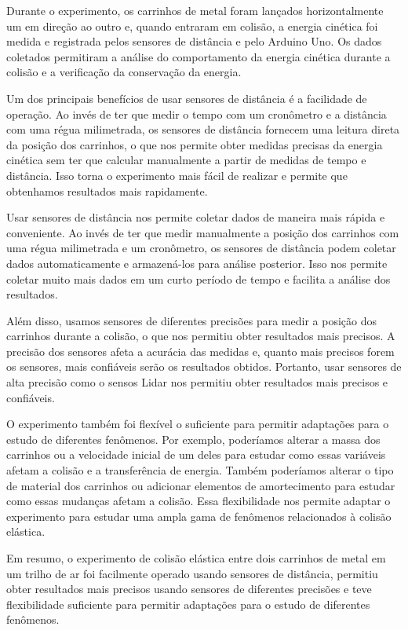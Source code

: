 \documentclass[a4paper,12pt]{article}
\begin{document}
\begin{multicols}{2}
Durante o experimento, os carrinhos de metal foram lançados horizontalmente um em direção ao outro e, quando entraram em colisão, a energia cinética foi medida e registrada pelos sensores de distância e pelo Arduino Uno. Os dados coletados permitiram a análise do comportamento da energia cinética durante a colisão e a verificação da conservação da energia.

Um dos principais benefícios de usar sensores de distância é a facilidade de operação. Ao invés de ter que medir o tempo com um cronômetro e a distância com uma régua milimetrada, os sensores de distância fornecem uma leitura direta da posição dos carrinhos, o que nos permite obter medidas precisas da energia cinética sem ter que calcular manualmente a partir de medidas de tempo e distância. Isso torna o experimento mais fácil de realizar e permite que obtenhamos resultados mais rapidamente.

Usar sensores de distância nos permite coletar dados de maneira mais rápida e conveniente. Ao invés de ter que medir manualmente a posição dos carrinhos com uma régua milimetrada e um cronômetro, os sensores de distância podem coletar dados automaticamente e armazená-los para análise posterior. Isso nos permite coletar muito mais dados em um curto período de tempo e facilita a análise dos resultados.

Além disso, usamos sensores de diferentes precisões para medir a posição dos carrinhos durante a colisão, o que nos permitiu obter resultados mais precisos. A precisão dos sensores afeta a acurácia das medidas e, quanto mais precisos forem os sensores, mais confiáveis serão os resultados obtidos. Portanto, usar sensores de alta precisão como o sensos Lidar nos permitiu obter resultados mais precisos e confiáveis.

O experimento também foi flexível o suficiente para permitir adaptações para o estudo de diferentes fenômenos. Por exemplo, poderíamos alterar a massa dos carrinhos ou a velocidade inicial de um deles para estudar como essas variáveis afetam a colisão e a transferência de energia. Também poderíamos alterar o tipo de material dos carrinhos ou adicionar elementos de amortecimento para estudar como essas mudanças afetam a colisão. Essa flexibilidade nos permite adaptar o experimento para estudar uma ampla gama de fenômenos relacionados à colisão elástica.

Em resumo, o experimento de colisão elástica entre dois carrinhos de metal em um trilho de ar foi facilmente operado usando sensores de distância, permitiu obter resultados mais precisos usando sensores de diferentes precisões e teve flexibilidade suficiente para permitir adaptações para o estudo de diferentes fenômenos.


\end{multicols}
\end{document}
